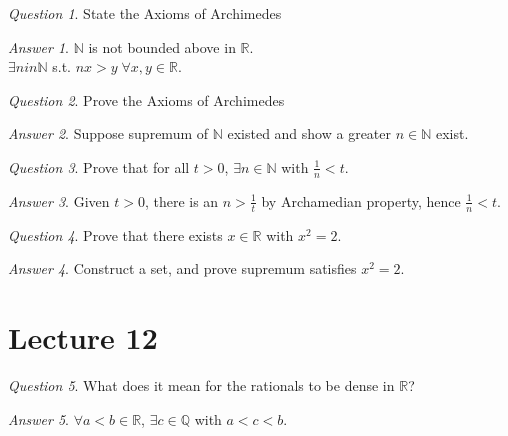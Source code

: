 \documentclass[]{article}
\def\naturals{\mathbb{N}}
\def\rationals{\mathbb{Q}}
\def\reals{\mathbb{R}}
\theoremstyle{remark}
\theoremstyle{qnstyle}
\newtheorem{question}{Question}
\theoremstyle{answerstyle}
\newtheorem*{answer}{Answer}
\begin{document}
\begin{question}
    State the Axioms of Archimedes
\end{question}
\begin{answer}
    $\naturals$ is not bounded above in $\reals$. \\
    $\exists n in \naturals$ s.t. $nx > y \; \forall x,y \in \reals$.
\end{answer}

\begin{question}
    Prove the Axioms of Archimedes
\end{question}
\begin{answer}
    Suppose supremum of $\naturals$ existed and show a greater $n \in \naturals$ exist.
\end{answer}

\begin{question}
    Prove that for all $t > 0$, $\exists n \in \naturals$ with $\frac{1}{n} < t$.
\end{question}
\begin{answer}
    Given $t > 0$, there is an $n > \frac{1}{t}$ by Archamedian property, hence
    $\frac{1}{n} < t$.
\end{answer}

\begin{question}
    Prove that there exists $x \in \reals$ with $x^2 = 2$.
\end{question}
\begin{answer}
    Construct a set, and prove supremum satisfies $x^2=2$.
\end{answer}





\section* {Lecture 12}

\begin{question}
    What does it mean for the rationals to be dense in $\reals$?
\end{question}
\begin{answer}
    $\forall a < b \in \reals$, $\exists c \in \rationals$ with $a < c < b$.
\end{answer}
\end{document}
